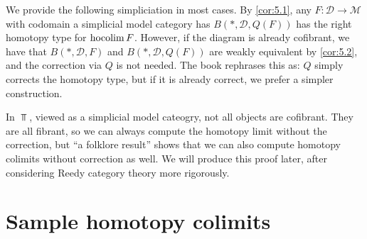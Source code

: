 We provide the following simpliciation in most cases. By \cref{cor:5.1}, any $F : \mathcal{D}  \to \mathcal{M} $ with codomain a simplicial model category has $B(*,\mathcal{D} ,Q(F))$ has the right homotopy type for $\operatorname*{hocolim} F$. However, if the diagram is already cofibrant, we have that $B(*,\mathcal{D} ,F)$ and $B(*,\mathcal{D} ,Q(F))$ are weakly equivalent by \cref{cor:5.2}, and the correction via $Q$ is not needed. The book rephrases this as: $Q$ simply corrects the homotopy type, but if it is already correct, we prefer a simpler construction.

\begin{remark}
	In $\Top $, viewed as a simplicial model cateogry, not all objects are cofibrant. They are all fibrant, so we can always compute the homotopy limit without the correction, but ``a folklore result'' shows that we can also compute homotopy colimits without correction as well. We will produce this proof later, after considering Reedy category theory more rigorously.
\end{remark}

\section{Sample homotopy colimits}

